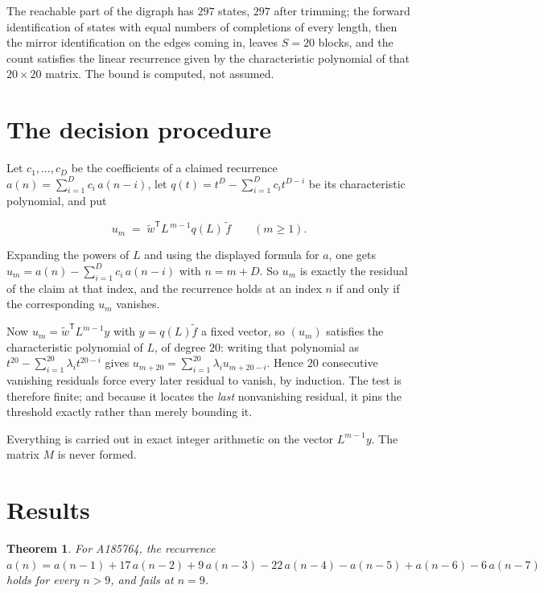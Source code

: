 \documentclass[11pt]{article}
\newtheorem{theorem}{Theorem}
\theoremstyle{definition}
\begin{document}
The reachable part of the digraph has $297$ states, $297$ after trimming; the forward identification of states with equal numbers of completions of every length, then the mirror identification on the edges coming in, leaves $S = 20$ blocks, and the count satisfies the linear recurrence given by the characteristic polynomial of that $20\times20$ matrix. The bound is computed, not assumed.

\section{The decision procedure}

Let $c_1,\dots,c_D$ be the coefficients of a claimed recurrence $a(n) = \sum_{i=1}^{D} c_i\,a(n-i)$, let $q(t) = t^{D} - \sum_{i=1}^{D} c_i t^{D-i}$ be its characteristic polynomial, and put

\[u_m \;=\; \tilde w^{\mathsf T} L^{\,m-1} q(L)\,\tilde f \qquad (m \ge 1).\]

Expanding the powers of $L$ and using the displayed formula for $a$, one gets $u_m = a(n) - \sum_{i=1}^{D} c_i\,a(n-i)$ with $n = m + D$. So $u_m$ is exactly the residual of the claim at that index, and the recurrence holds at an index $n$ if and only if the corresponding $u_m$ vanishes.

Now $u_m = \tilde w^{\mathsf T} L^{m-1} y$ with $y = q(L)\tilde f$ a fixed vector, so $(u_m)$ satisfies the characteristic polynomial of $L$, of degree $20$: writing that polynomial as $t^{20} - \sum_{i=1}^{20} \lambda_i t^{20-i}$ gives $u_{m+20} = \sum_{i=1}^{20} \lambda_i u_{m+20-i}$. Hence $20$ consecutive vanishing residuals force every later residual to vanish, by induction. The test is therefore finite; and because it locates the {\itshape last} nonvanishing residual, it pins the threshold exactly rather than merely bounding it.

Everything is carried out in exact integer arithmetic on the vector $L^{m-1}y$. The matrix $M$ is never formed.

\section{Results}

\begin{theorem} For A185764, the recurrence $a(n) = a(n-1) + 17\,a(n-2) + 9\,a(n-3) - 22\,a(n-4) - a(n-5) + a(n-6) - 6\,a(n-7)$ holds for every $n > 9$, and fails at $n = 9$.\end{theorem}
\end{document}
